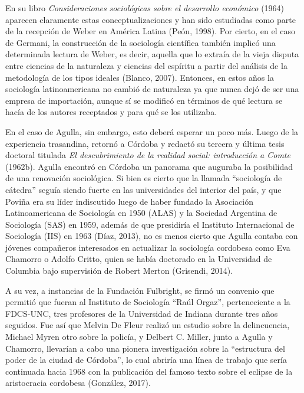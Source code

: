En su libro \emph{Consideraciones sociológicas sobre el desarrollo económico} (1964) aparecen claramente estas conceptualizaciones y han sido estudiadas como parte de la recepción de Weber en América Latina (Peón, 1998). Por cierto, en el caso de Germani, la construcción de la sociología científica también implicó una determinada lectura de Weber, es decir, aquella que lo extraía de la vieja disputa entre ciencias de la naturaleza y ciencias del espíritu a partir del análisis de la metodología de los tipos ideales (Blanco, 2007). Entonces, en estos años la sociología latinoamericana no cambió de naturaleza ya que nunca dejó de ser una empresa de importación, aunque sí se modificó en términos de qué lectura se hacía de los autores receptados y para qué se los utilizaba.

En el caso de Agulla, sin embargo, esto deberá esperar un poco más. Luego de la experiencia trasandina, retornó a Córdoba y redactó su tercera y última tesis doctoral titulada \emph{El descubrimiento de la realidad social: introducción a Comte} (1962b). Agulla encontró en Córdoba un panorama que auguraba la posibilidad de una renovación sociológica. Si bien es cierto que la llamada ``sociología de cátedra'' seguía siendo fuerte en las universidades del interior del país, y que Poviña era su líder indiscutido luego de haber fundado la Asociación Latinoamericana de Sociología en 1950 (ALAS) y la Sociedad Argentina de Sociología (SAS) en 1959, además de que presidiría el Instituto Internacional de Sociología (IIS) en 1963 (Díaz, 2013), no es menos cierto que Agulla contaba con jóvenes compañeros interesados en actualizar la sociología cordobesa como Eva Chamorro o Adolfo Critto, quien se había doctorado en la Universidad de Columbia bajo supervisión de Robert Merton (Grisendi, 2014).

A su vez, a instancias de la Fundación Fulbright, se firmó un convenio que permitió que fueran al Instituto de Sociología ``Raúl Orgaz'', perteneciente a la FDCS-UNC, tres profesores de la Universidad de Indiana durante tres años seguidos. Fue así que Melvin De Fleur realizó un estudio sobre la delincuencia, Michael Myren otro sobre la policía, y Delbert C. Miller, junto a Agulla y Chamorro, llevarían a cabo una pionera investigación sobre la ``estructura del poder de la ciudad de Córdoba'', lo cual abriría una línea de trabajo que sería continuada hacia 1968 con la publicación del famoso texto sobre el eclipse de la aristocracia cordobesa (González, 2017).

